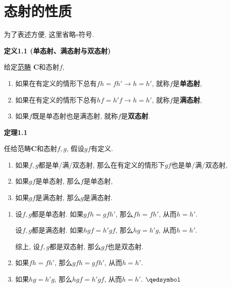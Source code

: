 \documentclass[UTF8]{ctexart}
\begin{document}
\setlength{\abovedisplayskip}{1pt}
\setlength{\belowdisplayskip}{1pt}

\section{态射的性质}

为了表述方便, 这里省略$\circ$符号.

\vspace{10pt}

\hypertarget{sec:定义1.1}{}
\noindent\textbf{定义1.1 (单态射、满态射与双态射)}

给定\href{01 范畴#nameddest=sec:定义1.1}{范畴} $\mathbf{C}$和态射$f$,
\begin{enumerate}
    \item 如果在有定义的情形下总有$fh=fh'\to h=h'$, 就称$f$是\textbf{单态射},
    \item 如果在有定义的情形下总有$hf=h'f\to h=h'$, 就称$f$是\textbf{满态射},
    \item 如果$f$既是单态射也是满态射, 就称$f$是\textbf{双态射}.
\end{enumerate}

\vspace{10pt}

\hypertarget{sec:定理1.1}{}
\noindent\textbf{定理1.1}

任给范畴$\mathbf{C}$和态射$f,g$, 假设$gf$有定义.
\begin{enumerate}
    \item 如果$f,g$都是单/满/双态射, 那么在有定义的情形下$gf$也是单/满/双态射,
    \item 如果$gf$是单态射, 那么$f$是单态射,
    \item 如果$gf$是满态射, 那么$g$是满态射.
\end{enumerate}


\begin{enumerate}
    \item 设$f,g$都是单态射. 如果$gfh=gfh'$,  那么$fh=fh'$, 从而$h=h'$.
    
    {\hspace{2.17em}}
    设$f,g$都是满态射. 如果$hgf=h'gf$, 那么$hg=h'g$, 从而$h=h'$.

    \hspace{2.17em}
    综上, 设$f,g$都是双态射, 那么$gf$也是双态射.

    \item 如果$fh=fh'$, 那么$gfh=gfh'$, 从而$h=h'$.
    
    \item 如果$hg=h'g$, 那么$hgf=h'gf$, 从而$h=h'$. \hfill $\qedsymbol$
\end{enumerate}
\end{document}
